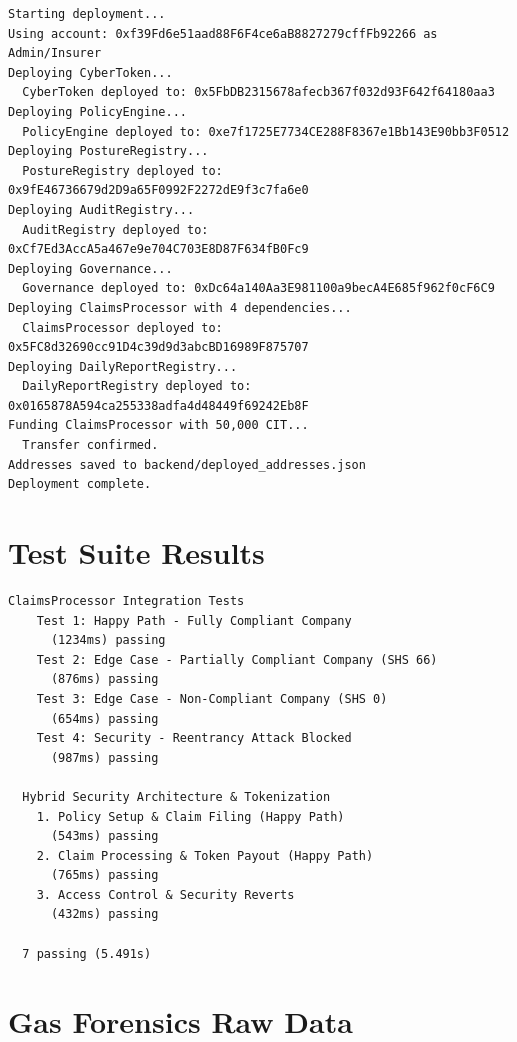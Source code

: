 \documentclass[12pt,a4paper]{article}
\begin{document}
\begin{lstlisting}[style=aegiscode,
  caption={Output of: npx hardhat run scripts/deploy.js --network localhost}]
Starting deployment...
Using account: 0xf39Fd6e51aad88F6F4ce6aB8827279cffFb92266 as Admin/Insurer
Deploying CyberToken...
  CyberToken deployed to: 0x5FbDB2315678afecb367f032d93F642f64180aa3
Deploying PolicyEngine...
  PolicyEngine deployed to: 0xe7f1725E7734CE288F8367e1Bb143E90bb3F0512
Deploying PostureRegistry...
  PostureRegistry deployed to: 0x9fE46736679d2D9a65F0992F2272dE9f3c7fa6e0
Deploying AuditRegistry...
  AuditRegistry deployed to: 0xCf7Ed3AccA5a467e9e704C703E8D87F634fB0Fc9
Deploying Governance...
  Governance deployed to: 0xDc64a140Aa3E981100a9becA4E685f962f0cF6C9
Deploying ClaimsProcessor with 4 dependencies...
  ClaimsProcessor deployed to: 0x5FC8d32690cc91D4c39d9d3abcBD16989F875707
Deploying DailyReportRegistry...
  DailyReportRegistry deployed to: 0x0165878A594ca255338adfa4d48449f69242Eb8F
Funding ClaimsProcessor with 50,000 CIT...
  Transfer confirmed.
Addresses saved to backend/deployed_addresses.json
Deployment complete.
\end{lstlisting}

\section{Test Suite Results}
\label{app:tests}

\begin{lstlisting}[style=aegiscode,
  caption={Output of: npx hardhat test}]
  ClaimsProcessor Integration Tests
    Test 1: Happy Path - Fully Compliant Company
      (1234ms) passing
    Test 2: Edge Case - Partially Compliant Company (SHS 66)
      (876ms) passing
    Test 3: Edge Case - Non-Compliant Company (SHS 0)
      (654ms) passing
    Test 4: Security - Reentrancy Attack Blocked
      (987ms) passing

  Hybrid Security Architecture & Tokenization
    1. Policy Setup & Claim Filing (Happy Path)
      (543ms) passing
    2. Claim Processing & Token Payout (Happy Path)
      (765ms) passing
    3. Access Control & Security Reverts
      (432ms) passing

  7 passing (5.491s)
\end{lstlisting}

\section{Gas Forensics Raw Data}
\label{app:gas}
\end{document}
